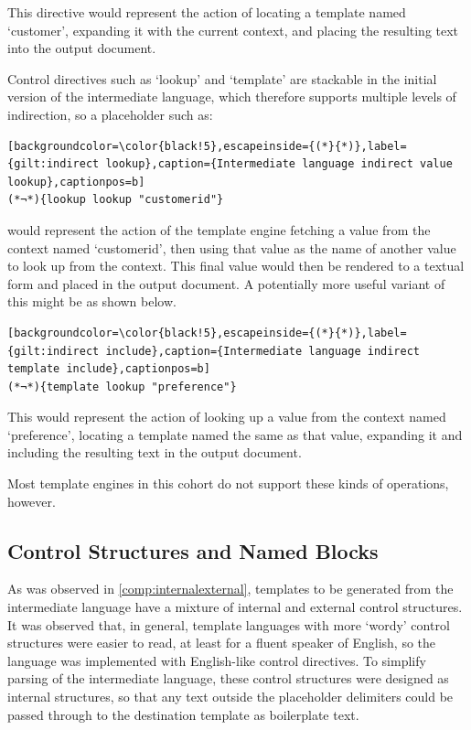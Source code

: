This directive would represent the action of locating a template named `customer', expanding it with the current context, and placing the resulting text into the output document.

Control directives such as `lookup' and `template' are stackable in the initial version of the intermediate language, which therefore supports multiple levels of indirection, so a placeholder such as:

\begin{lstlisting}[backgroundcolor=\color{black!5},escapeinside={(*}{*)},label={gilt:indirect lookup},caption={Intermediate language indirect value lookup},captionpos=b]
(*¬*){lookup lookup "customerid"}
\end{lstlisting}

would represent the action of the template engine fetching a value from the context named `customerid', then using that value as the name of another value to look up from the context. This final value would then be rendered to a textual form and placed in the output document. A potentially more useful variant of this might be as shown below.

\begin{lstlisting}[backgroundcolor=\color{black!5},escapeinside={(*}{*)},label={gilt:indirect include},caption={Intermediate language indirect template include},captionpos=b]
(*¬*){template lookup "preference"}
\end{lstlisting}

This would represent the action of looking up a value from the context named `preference', locating a template named the same as that value, expanding it and including the resulting text in the output document.

Most template engines in this cohort do not support these kinds of operations, however.

\subsection*{Control Structures and Named Blocks}
\label{gilt:control}

As was observed in \autoref{comp:internalexternal}, templates to be generated from the intermediate language have a mixture of internal and external control structures. It was observed that, in general, template languages with more `wordy' control structures were easier to read, at least for a fluent speaker of English, so the language was implemented with English-like control directives. To simplify parsing of the intermediate language, these control structures were designed as internal structures, so that any text outside the placeholder delimiters could be passed through to the destination template as boilerplate text.

